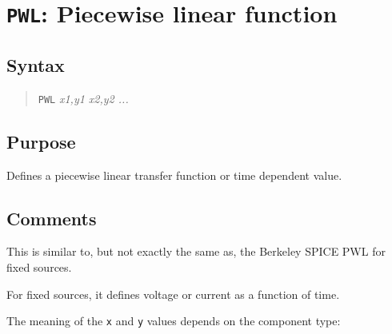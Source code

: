 %
%
%
%
\section{{\tt PWL}: Piecewise linear function}
\subsection{Syntax}
\begin{verse}
{\tt PWL} {\it x1,y1 x2,y2 ...}
\end{verse}
\subsection{Purpose}

Defines a piecewise linear transfer function or time dependent value.
\subsection{Comments}

This is similar to, but not exactly the same as, the Berkeley SPICE
PWL for fixed sources.

For fixed sources, it defines voltage or current as a function of
time.

The meaning of the {\tt x} and {\tt y} values depends on the component type:

